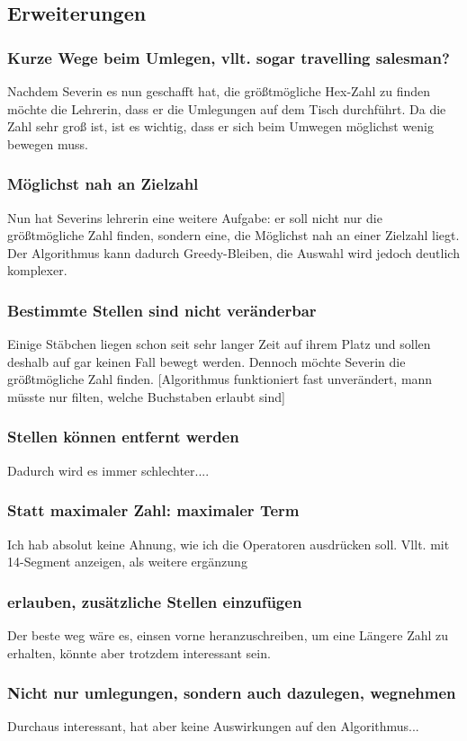 \documentclass[a4paper,10pt,ngerman]{scrartcl}
\begin{document}
\subsection{Erweiterungen}
\subsubsection{Kurze Wege beim Umlegen, vllt. sogar travelling salesman?}
Nachdem Severin es nun geschafft hat, die größtmögliche Hex-Zahl zu finden möchte die Lehrerin, dass er die Umlegungen auf dem Tisch durchführt. Da die Zahl sehr groß ist, ist es wichtig, dass er sich beim Umwegen möglichst wenig bewegen muss. 
\subsubsection{Möglichst nah an Zielzahl}
Nun hat Severins lehrerin eine weitere Aufgabe: er soll nicht nur die größtmögliche Zahl finden, sondern eine, die Möglichst nah an einer Zielzahl liegt. Der Algorithmus kann dadurch Greedy-Bleiben, die Auswahl wird jedoch deutlich komplexer.
\subsubsection{Bestimmte Stellen sind nicht veränderbar}
Einige Stäbchen liegen schon seit sehr langer Zeit auf ihrem Platz und sollen deshalb auf gar keinen Fall bewegt werden. Dennoch möchte Severin die größtmögliche Zahl finden. 
[Algorithmus funktioniert fast unverändert, mann müsste nur filten, welche Buchstaben erlaubt sind]
\subsubsection{Stellen können entfernt werden}
Dadurch wird es immer schlechter.... 
\subsubsection{Statt maximaler Zahl: maximaler Term}
Ich hab absolut keine Ahnung, wie ich die Operatoren ausdrücken soll. Vllt. mit 14-Segment anzeigen, als weitere ergänzung
\subsubsection{erlauben, zusätzliche Stellen einzufügen}
Der beste weg wäre es, einsen vorne heranzuschreiben, um eine Längere Zahl zu erhalten, könnte aber trotzdem interessant sein.
\subsubsection{Nicht nur umlegungen, sondern auch dazulegen, wegnehmen}
Durchaus interessant, hat aber keine Auswirkungen auf den Algorithmus...
\end{document}
